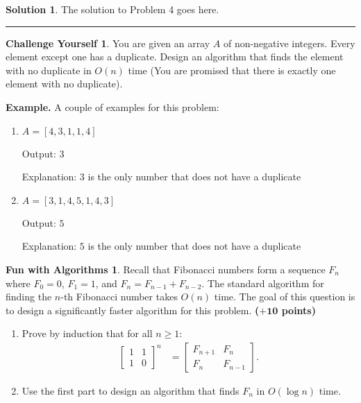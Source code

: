 \documentclass{article}
\theoremstyle{definition}
\newtheorem*{fun}{Fun with Algorithms}
\newtheorem*{challenge}{Challenge Yourself}
\def\fline{\rule{0.75\linewidth}{0.5pt}}
\newcommand{\finishline}{\begin{center}\fline\end{center}}
\newtheorem*{solution*}{Solution}
\newenvironment{solution}{\begin{solution*}}{{\finishline} \end{solution*}}
\newcommand{\grade}[1]{\hfill{\textbf{($\mathbf{#1}$ points)}}}
\begin{document}
\begin{solution}

		The solution to Problem 4 goes here. 
	\end{solution}
	
	


\smallskip



\begin{challenge}
	You are given an array $A$ of non-negative integers. Every element except one has a duplicate. Design an algorithm that finds the element with no duplicate in $O(n)$ time (You are promised that there is exactly one element with no duplicate).
		
	\textbf{Example.} A couple of examples for this problem:
	\begin{enumerate}
			
		\item  $A = [4,3,1,1,4]$
			
			Output: $3$
			
			Explanation:
			$3$ is the only number that does not have a duplicate
			
			\item  $A = [3,1,4,5,1,4,3]$
			
			Output: $5$
			
			Explanation:
			$5$ is the only number that does not have a duplicate
		\end{enumerate}
\end{challenge}

\smallskip

\begin{fun}
Recall that Fibonacci numbers form a sequence $F_n$ where $F_0 = 0$, $F_1 = 1$, and $F_n = F_{n-1} + F_{n-2}$. 
The standard algorithm for finding the $n$-th Fibonacci number takes $O(n)$ time. The goal of this question is to design a significantly faster algorithm for this problem. \grade{+10}
		\begin{enumerate}[label=(\alph*)]
		\item Prove by induction that for all $n \geq 1$: 
		\begin{align*}
			\begin{bmatrix}
				1 & 1 \\
				1 & 0
			\end{bmatrix}^n
			&= 	\begin{bmatrix}
				F_{n+1} & F_n \\
				F_n & F_{n-1}
			\end{bmatrix}.
		\end{align*}
		\item Use the first part to design an algorithm that finds $F_n$ in $O(\log{n})$ time. 
	\end{enumerate}	 
\end{fun}
\end{document}
